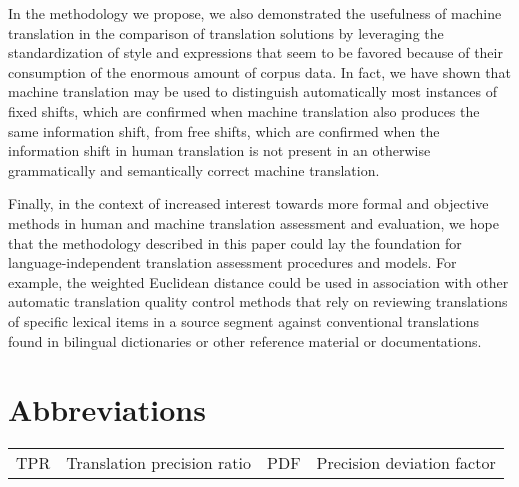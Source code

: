 \documentclass[output=paper]{langsci/langscibook}
\begin{document}
In the methodology we propose, we also demonstrated the usefulness of machine translation in the comparison of translation solutions by leveraging the standardization of style and expressions that seem to be favored because of their consumption of the enormous amount of corpus data. In fact, we have shown that machine translation may be used to distinguish automatically most instances of fixed shifts, which are confirmed when machine translation also produces the same information shift, from free shifts, which are confirmed when the information shift in human translation is not present in an otherwise grammatically and semantically correct machine translation.

Finally, in the context of increased interest towards more formal and objective methods in human and machine translation assessment and evaluation, we hope that the methodology described in this paper could lay the foundation for language-independent translation assessment procedures and models. For example, the weighted Euclidean distance could be used in association with other automatic translation quality control methods that rely on reviewing translations of specific lexical items in a source segment against conventional translations found in bilingual dictionaries or other reference material or documentations.

\section*{Abbreviations}

\begin{tabularx}{.75\textwidth}{ll@{\qquad}ll}
TPR & Translation precision ratio &
PDF & Precision deviation factor \\
\end{tabularx}

{\sloppy\printbibliography[heading=subbibliography,notkeyword=this]}
\end{document}
